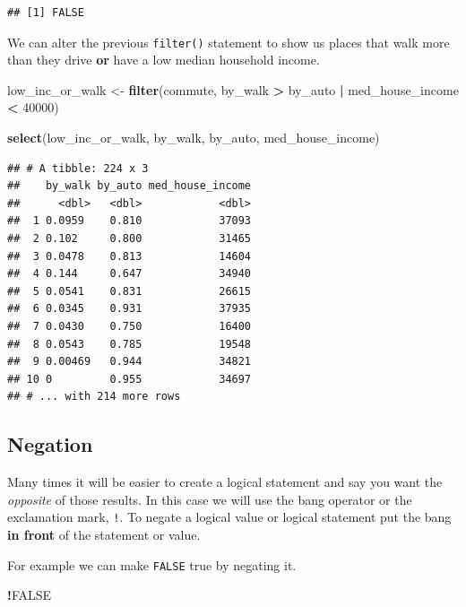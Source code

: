 \documentclass[
]{book}
\newenvironment{Shaded}{\begin{snugshade}}{\end{snugshade}}
\newcommand{\DecValTok}[1]{\textcolor[rgb]{0.00,0.00,0.81}{#1}}
\newcommand{\KeywordTok}[1]{\textcolor[rgb]{0.13,0.29,0.53}{\textbf{#1}}}
\newcommand{\NormalTok}[1]{#1}
\newcommand{\OperatorTok}[1]{\textcolor[rgb]{0.81,0.36,0.00}{\textbf{#1}}}
\newcommand{\OtherTok}[1]{\textcolor[rgb]{0.56,0.35,0.01}{#1}}
\newcommand{\StringTok}[1]{\textcolor[rgb]{0.31,0.60,0.02}{#1}}
\begin{document}
\begin{verbatim}
## [1] FALSE
\end{verbatim}

We can alter the previous \texttt{filter()} statement to show us places that walk more than they drive \textbf{or} have a low median household income.

\begin{Shaded}
\begin{Highlighting}[]
\NormalTok{low\_inc\_or\_walk \textless{}{-}}\StringTok{ }\KeywordTok{filter}\NormalTok{(commute,}
\NormalTok{                          by\_walk }\OperatorTok{\textgreater{}}\StringTok{ }\NormalTok{by\_auto }\OperatorTok{|}\StringTok{ }\NormalTok{med\_house\_income }\OperatorTok{\textless{}}\StringTok{ }\DecValTok{40000}\NormalTok{)}

\KeywordTok{select}\NormalTok{(low\_inc\_or\_walk, by\_walk, by\_auto, med\_house\_income)}
\end{Highlighting}
\end{Shaded}

\begin{verbatim}
## # A tibble: 224 x 3
##    by_walk by_auto med_house_income
##      <dbl>   <dbl>            <dbl>
##  1 0.0959    0.810            37093
##  2 0.102     0.800            31465
##  3 0.0478    0.813            14604
##  4 0.144     0.647            34940
##  5 0.0541    0.831            26615
##  6 0.0345    0.931            37935
##  7 0.0430    0.750            16400
##  8 0.0543    0.785            19548
##  9 0.00469   0.944            34821
## 10 0         0.955            34697
## # ... with 214 more rows
\end{verbatim}

\hypertarget{negation}{%
\subsection{Negation}\label{negation}}

Many times it will be easier to create a logical statement and say you want the \emph{opposite} of those results. In this case we will use the bang operator or the exclamation mark, \texttt{!}. To negate a logical value or logical statement put the bang \textbf{in front} of the statement or value.

For example we can make \texttt{FALSE} true by negating it.

\begin{Shaded}
\begin{Highlighting}[]
\OperatorTok{!}\OtherTok{FALSE}
\end{Highlighting}
\end{Shaded}
\end{document}
